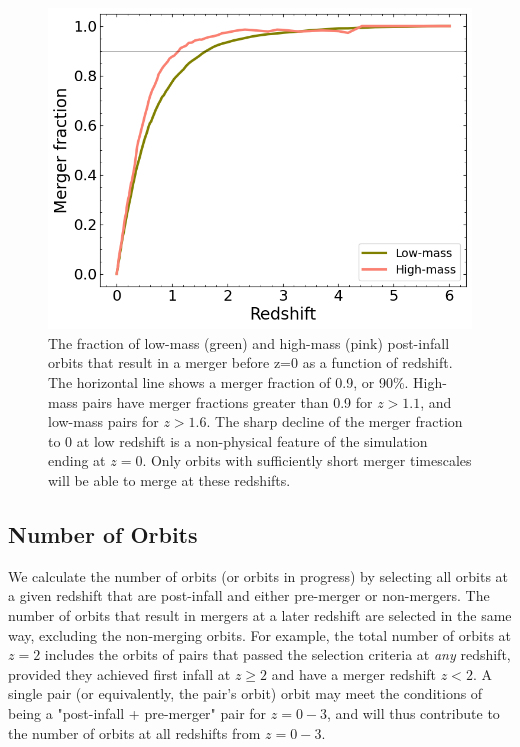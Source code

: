 \documentclass[twocolumn,linenumbers]{aastex631}
\begin{document}
\begin{figure}[htb]
    \begin{center}
    \includegraphics[width=\columnwidth]{plots/bet-on-it/6_mergerfraction.png}
    \caption{The fraction of low-mass (green) and high-mass (pink) post-infall orbits that result in a merger before z=0 as a function of redshift. 
    The horizontal line shows a merger fraction of 0.9, or 90\%. 
    High-mass pairs have merger fractions greater than 0.9 for $z>1.1$, and low-mass pairs for $z>1.6$.
    The sharp decline of the merger fraction to 0 at low redshift is a non-physical feature of the simulation ending at $z=0$.
    Only orbits with sufficiently short merger timescales will be able to merge at these redshifts.}
    \label{fig:fmerge}
    \end{center}
\end{figure}

\subsection{Number of Orbits}
We calculate the number of orbits (or orbits in progress) by selecting all orbits at a given redshift that are post-infall and either pre-merger or non-mergers.
The number of orbits that result in mergers at a later redshift are selected in the same way, excluding the non-merging orbits.
For example, the total number of orbits at $z=2$ includes the orbits of pairs that passed the selection criteria at \textit{any} redshift, provided they achieved first infall at $z\geq2$ and have a merger redshift $z<2$. 
A single pair (or equivalently, the pair's orbit) orbit may meet the conditions of being a "post-infall + pre-merger" pair for $z=0-3$, and will thus contribute to the number of orbits at all redshifts from $z=0-3$. 
\end{document}
